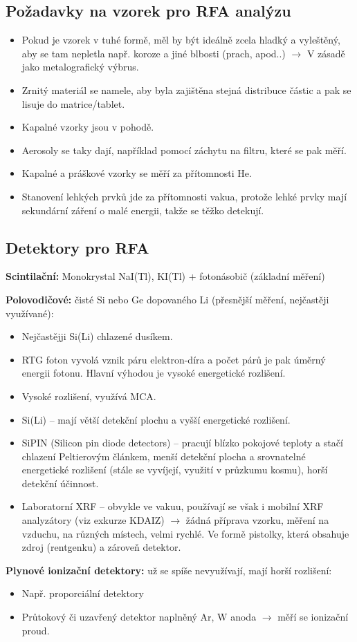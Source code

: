\subsection{Požadavky na vzorek pro RFA analýzu}

\begin{itemize}
    \item Pokud je vzorek v tuhé formě, měl by být ideálně zcela hladký a vyleštěný, aby se tam nepletla např. koroze a jiné blbosti (prach, apod..) $\rightarrow$ V zásadě jako metalografický výbrus.
    \item Zrnitý materiál se namele, aby byla zajištěna stejná distribuce částic a pak se lisuje do matrice/tablet.
    \item Kapalné vzorky jsou v pohodě.
    \item Aerosoly se taky dají, například pomocí záchytu na filtru, které se pak měří.
    \item Kapalné a práškové vzorky se měří za přítomnosti He.
    \item Stanovení lehkých prvků jde za přítomnosti vakua, protože lehké prvky mají sekundární záření o malé energii, takže se těžko detekují.
\end{itemize}

\subsection{Detektory pro RFA}

\textbf{Scintilační:} Monokrystal NaI(Tl), KI(Tl) + fotonásobič (základní měření)

\textbf{Polovodičové:} čisté Si nebo Ge dopovaného Li (přesnější měření, nejčastěji využívané):

\begin{itemize}
    \item Nejčastějji Si(Li) chlazené dusíkem.
    \item RTG foton vyvolá vznik páru elektron-díra a počet párů je pak úměrný energii fotonu. Hlavní výhodou je vysoké energetické rozlišení.
    \item Vysoké rozlišení, využívá MCA.
    \item Si(Li) -- mají větší detekční plochu a vyšší energetické rozlišení.
    \item SiPIN (Silicon pin diode detectors) -- pracují blízko pokojové teploty a stačí chlazení Peltierovým článkem, menší detekční plocha a srovnatelné energetické rozlišení (stále se vyvíjejí, využití v průzkumu kosmu), horší detekční účinnost.
    \item Laboratorní XRF -- obvykle ve vakuu, používají se však i mobilní XRF analyzátory (viz exkurze KDAIZ) $\rightarrow$ žádná příprava vzorku, měření na vzduchu, na různých místech, velmi rychlé. Ve formě pistolky, která obsahuje zdroj (rentgenku) a zároveň detektor.
\end{itemize}

\textbf{Plynové ionizační detektory:} už se spíše nevyužívají, mají horší rozlišení:

\begin{itemize}
    \item Např. proporciální detektory
    \item Průtokový či uzavřený detektor naplněný Ar, W anoda $\rightarrow$ měří se ionizační proud.
\end{itemize}